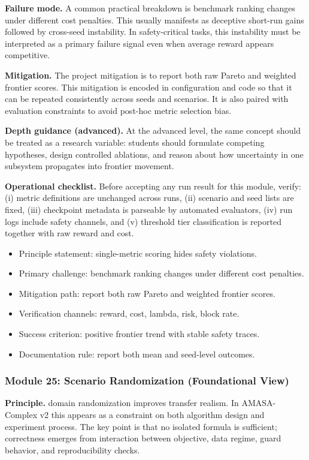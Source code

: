 \documentclass[conference]{IEEEtran}
\begin{document}
\textbf{Failure mode.} A common practical breakdown is benchmark ranking changes under different cost penalties. This usually manifests as deceptive short-run gains followed by cross-seed instability. In safety-critical tasks, this instability must be interpreted as a primary failure signal even when average reward appears competitive.

\textbf{Mitigation.} The project mitigation is to report both raw Pareto and weighted frontier scores. This mitigation is encoded in configuration and code so that it can be repeated consistently across seeds and scenarios. It is also paired with evaluation constraints to avoid post-hoc metric selection bias.

\textbf{Depth guidance (advanced).} At the advanced level, the same concept should be treated as a research variable: students should formulate competing hypotheses, design controlled ablations, and reason about how uncertainty in one subsystem propagates into frontier movement.

\textbf{Operational checklist.} Before accepting any run result for this module, verify: (i) metric definitions are unchanged across runs, (ii) scenario and seed lists are fixed, (iii) checkpoint metadata is parseable by automated evaluators, (iv) run logs include safety channels, and (v) threshold tier classification is reported together with raw reward and cost.

\begin{itemize}[leftmargin=*]
  \item Principle statement: single-metric scoring hides safety violations.
  \item Primary challenge: benchmark ranking changes under different cost penalties.
  \item Mitigation path: report both raw Pareto and weighted frontier scores.
  \item Verification channels: reward, cost, lambda, risk, block rate.
  \item Success criterion: positive frontier trend with stable safety traces.
  \item Documentation rule: report both mean and seed-level outcomes.
\end{itemize}


\subsubsection{Module 25: Scenario Randomization (Foundational View)}
\textbf{Principle.} domain randomization improves transfer realism. In AMASA-Complex v2 this appears as a constraint on both algorithm design and experiment process. The key point is that no isolated formula is sufficient; correctness emerges from interaction between objective, data regime, guard behavior, and reproducibility checks.
\end{document}
